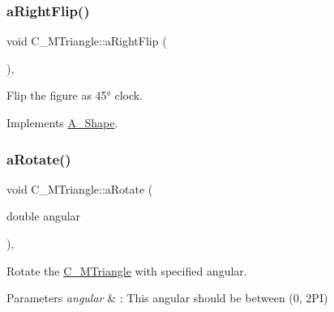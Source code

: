 \mbox{\label{classC__MTriangle_aa3a1fc0604fa7e13b6c89d242357a163}} 
\subsubsection{\texorpdfstring{a\+Right\+Flip()}{aRightFlip()}\hspace{0.1cm}{\footnotesize\ttfamily [2/2]}}
{\footnotesize\ttfamily void C\+\_\+\+M\+Triangle\+::a\+Right\+Flip (\begin{DoxyParamCaption}{ }\end{DoxyParamCaption})\hspace{0.3cm}{\ttfamily [override]}, {\ttfamily [virtual]}}



Flip the figure as 45° clock. 



Implements \hyperlink{classA__Shape_a892688cbbad3297e00e87cce0dbfc76d}{A\+\_\+\+Shape}.

\mbox{\label{classC__MTriangle_a33aa36879be70b0a11863801da56e92e}} 
\subsubsection{\texorpdfstring{a\+Rotate()}{aRotate()}\hspace{0.1cm}{\footnotesize\ttfamily [1/2]}}
{\footnotesize\ttfamily void C\+\_\+\+M\+Triangle\+::a\+Rotate (\begin{DoxyParamCaption}\item[{double}]{angular }\end{DoxyParamCaption})\hspace{0.3cm}{\ttfamily [override]}, {\ttfamily [virtual]}}



Rotate the \hyperlink{classC__MTriangle}{C\+\_\+\+M\+Triangle} with specified angular. 


\begin{DoxyParams}{Parameters}
{\em angular} & \+: This angular should be between (0, 2\+PI) \\
\hline
\end{DoxyParams}


